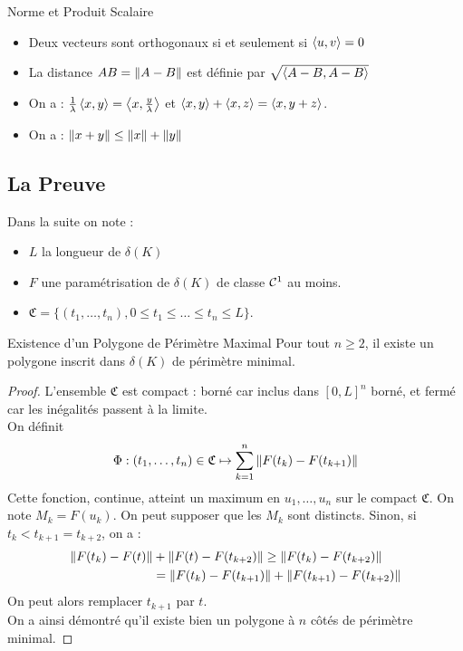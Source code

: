 \documentclass{cours}
\begin{document}
\begin{propositionfr}{Norme et Produit Scalaire}{}
    \begin{itemize}
        \item Deux vecteurs sont orthogonaux si et seulement si $\left\langle u, v \right\rangle = 0$
        \item La distance $AB = \left\lVert A - B \right\rVert$ est définie par $\sqrt{\left\langle A - B, A - B \right\rangle}$
        \item On a : $\frac{1}{\lambda} \left\langle x, y \right\rangle = \left\langle x, {y \over \lambda} \right\rangle$ et $\left\langle x, y \right\rangle + \left\langle x, z \right\rangle = \left\langle x, y + z \right\rangle$.
        \item On a : $\left\lVert x + y \right\rVert \leq \left\lVert x \right\rVert + \left\lVert y \right\rVert$
    \end{itemize}
\end{propositionfr}

\subsection{La Preuve}

Dans la suite on note :
\begin{itemize}
    \item $L$ la longueur de $\delta(K)$
    \item $F$ une paramétrisation de $\delta(K)$ de classe $\mathcal{C}^{1}$ au moins.
    \item $\mathfrak{C}= \{\left(t_{1}, \ldots, t_{n}\right), 0 \leq t_{1} \leq \dots \leq t_{n}\leq L\}$.
\end{itemize}

\begin{propositionfr}{Existence d'un Polygone de Périmètre Maximal}{}
    Pour tout $n \geq 2$, il existe un polygone inscrit dans $\delta(K)$ de périmètre minimal.
\end{propositionfr}
\begin{proof}
    L'ensemble $\mathfrak{C}$ est compact : borné car inclus dans $\left[0, L\right]^{n}$ borné, et fermé car les inégalités passent à la limite.\\
    On définit
    \[
        \Phi : (t_{1}, \ldots, t_{n}) \in \mathfrak{C}\mapsto \sum_{k = 1}^{n} \left\lVert F(t_{k}) - F(t_{k + 1}) \right\rVert
    \]
    Cette fonction, continue, atteint un maximum en $u_{1}, \ldots, u_{n}$ sur le compact $\mathfrak{C}$. On note $M_{k} = F(u_{k})$.
    On peut supposer que les $M_{k}$ sont distincts. Sinon, si $t_{k} < t_{k + 1} = t_{k + 2}$, on a :
    \[
        \begin{aligned}
            \left\lVert F(t_{k})- F(t) \right\rVert & + \left\lVert F(t) - F(t_{k +2}) \right\rVert \geq \left\lVert F(t_{k}) - F(t_{k + 2}) \right\rVert \\ & = \left\lVert F(t_{k}) - F(t_{k + 1}) \right\rVert + \left\lVert F(t_{k + 1}) - F(t_{k + 2}) \right\rVert
        \end{aligned}
    \]
    On peut alors remplacer $t_{k + 1}$ par $t$.\\
    On a ainsi démontré qu'il existe bien un polygone à $n$ côtés de périmètre minimal.
\end{proof}
\end{document}
